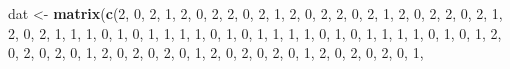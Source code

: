 \documentclass[
  12pt,
]{krantz}
\newenvironment{Shaded}{\begin{snugshade}}{\end{snugshade}}
\newcommand{\DecValTok}[1]{\textcolor[rgb]{0.00,0.00,0.81}{#1}}
\newcommand{\FunctionTok}[1]{\textcolor[rgb]{0.13,0.29,0.53}{\textbf{#1}}}
\newcommand{\NormalTok}[1]{#1}
\newcommand{\OtherTok}[1]{\textcolor[rgb]{0.56,0.35,0.01}{#1}}
\begin{document}
\begin{Shaded}
\begin{Highlighting}[]
\NormalTok{dat }\OtherTok{\textless{}{-}} \FunctionTok{matrix}\NormalTok{(}\FunctionTok{c}\NormalTok{(}\DecValTok{2}\NormalTok{, }\DecValTok{0}\NormalTok{, }\DecValTok{2}\NormalTok{, }\DecValTok{1}\NormalTok{, }\DecValTok{2}\NormalTok{, }\DecValTok{0}\NormalTok{, }\DecValTok{2}\NormalTok{,}
                \DecValTok{2}\NormalTok{, }\DecValTok{0}\NormalTok{, }\DecValTok{2}\NormalTok{, }\DecValTok{1}\NormalTok{, }\DecValTok{2}\NormalTok{, }\DecValTok{0}\NormalTok{, }\DecValTok{2}\NormalTok{,}
                \DecValTok{2}\NormalTok{, }\DecValTok{0}\NormalTok{, }\DecValTok{2}\NormalTok{, }\DecValTok{1}\NormalTok{, }\DecValTok{2}\NormalTok{, }\DecValTok{0}\NormalTok{, }\DecValTok{2}\NormalTok{,}
                \DecValTok{2}\NormalTok{, }\DecValTok{0}\NormalTok{, }\DecValTok{2}\NormalTok{, }\DecValTok{1}\NormalTok{, }\DecValTok{2}\NormalTok{, }\DecValTok{0}\NormalTok{, }\DecValTok{2}\NormalTok{,}
                \DecValTok{1}\NormalTok{, }\DecValTok{1}\NormalTok{, }\DecValTok{1}\NormalTok{, }\DecValTok{0}\NormalTok{, }\DecValTok{1}\NormalTok{, }\DecValTok{0}\NormalTok{, }\DecValTok{1}\NormalTok{,}
                \DecValTok{1}\NormalTok{, }\DecValTok{1}\NormalTok{, }\DecValTok{1}\NormalTok{, }\DecValTok{0}\NormalTok{, }\DecValTok{1}\NormalTok{, }\DecValTok{0}\NormalTok{, }\DecValTok{1}\NormalTok{,}
                \DecValTok{1}\NormalTok{, }\DecValTok{1}\NormalTok{, }\DecValTok{1}\NormalTok{, }\DecValTok{0}\NormalTok{, }\DecValTok{1}\NormalTok{, }\DecValTok{0}\NormalTok{, }\DecValTok{1}\NormalTok{,}
                \DecValTok{1}\NormalTok{, }\DecValTok{1}\NormalTok{, }\DecValTok{1}\NormalTok{, }\DecValTok{0}\NormalTok{, }\DecValTok{1}\NormalTok{, }\DecValTok{0}\NormalTok{, }\DecValTok{1}\NormalTok{,}
                \DecValTok{2}\NormalTok{, }\DecValTok{0}\NormalTok{, }\DecValTok{2}\NormalTok{, }\DecValTok{0}\NormalTok{, }\DecValTok{2}\NormalTok{, }\DecValTok{0}\NormalTok{, }\DecValTok{1}\NormalTok{,}
                \DecValTok{2}\NormalTok{, }\DecValTok{0}\NormalTok{, }\DecValTok{2}\NormalTok{, }\DecValTok{0}\NormalTok{, }\DecValTok{2}\NormalTok{, }\DecValTok{0}\NormalTok{, }\DecValTok{1}\NormalTok{,}
                \DecValTok{2}\NormalTok{, }\DecValTok{0}\NormalTok{, }\DecValTok{2}\NormalTok{, }\DecValTok{0}\NormalTok{, }\DecValTok{2}\NormalTok{, }\DecValTok{0}\NormalTok{, }\DecValTok{1}\NormalTok{,}
                \DecValTok{2}\NormalTok{, }\DecValTok{0}\NormalTok{, }\DecValTok{2}\NormalTok{, }\DecValTok{0}\NormalTok{, }\DecValTok{2}\NormalTok{, }\DecValTok{0}\NormalTok{, }\DecValTok{1}\NormalTok{,}

\end{Highlighting}
\end{Shaded}
\end{document}
